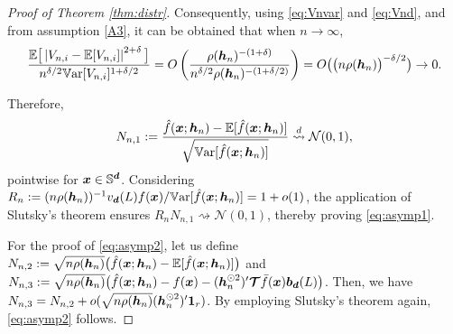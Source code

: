 \documentclass[oneside,11pt]{article}
\begin{document}
\begin{proof}[Proof of Theorem \ref{thm:distr}]
Consequently, using \eqref{eq:Vnvar} and \eqref{eq:Vnd}, and from assumption \ref{A3}, it can be obtained that when $n\to\infty$,
\begin{align*}
    \frac{\mathbb{E}\big[\left| V_{n,i}-\mathbb{E}[V_{n,i}]\right|^{2+\delta}\big]}{n^{\delta/2}\mathbb{V}\mathrm{ar}[V_{n,i}]^{1+\delta/2}}=O\left(\frac{\rho({\boldsymbol{h}}_n)^{-(1+\delta)}}{n^{\delta/2}\rho({\boldsymbol{h}}_n)^{-(1+\delta/2)}}\right)= O\big(\big(n\rho({\boldsymbol{h}}_n)\big)^{-\delta/2}\big)\to 0.
\end{align*}

Therefore,
\begin{align*}
    N_{n,1}:=\frac{\hat f(\boldsymbol{x};{\boldsymbol{h}}_n)-\mathbb{E}[\hat f(\boldsymbol{x};{\boldsymbol{h}}_n)]}{\sqrt{\mathbb{V}\mathrm{ar}[\hat f(\boldsymbol{x};{\boldsymbol{h}}_n)]}}\stackrel{d}{\rightsquigarrow} \mathcal{N}(0,1),
\end{align*}
pointwise for $\boldsymbol{x}\in\mathbb{S}^{\boldsymbol{d}}$. Considering $R_n:= (n\rho({\boldsymbol{h}}_n))^{-1}v_{\boldsymbol{d}}(L)f(\boldsymbol{x})/\mathbb{V}\mathrm{ar}[\hat f(\boldsymbol{x};{\boldsymbol{h}}_n)]=1+o(1)$, the application of Slutsky's theorem ensures $R_nN_{n,1}\rightsquigarrow \mathcal{N}(0,1)$, thereby proving \eqref{eq:asymp1}.

For the proof of \eqref{eq:asymp2}, let us define $N_{n,2}:=\sqrt{n\rho({\boldsymbol{h}}_n)}\big(\hat{f}(\boldsymbol{x};{\boldsymbol{h}}_n)-\mathbb{E}[\hat{f}(\boldsymbol{x};{\boldsymbol{h}}_n)]\big)$ and $N_{n,3}:=\sqrt{n\rho({\boldsymbol{h}}_n)}\allowbreak\big(\hat{f}(\boldsymbol{x};{\boldsymbol{h}}_n)-f(\boldsymbol{x})-({\boldsymbol{h}}_n^{\odot 2})'\boldsymbol{\mathcal{T}}\bar{f}(\boldsymbol{x})\boldsymbol{b}_{\boldsymbol{d}}(L)\big)$. Then, we have $N_{n,3}=N_{n,2}+o(\sqrt{n\rho({\boldsymbol{h}}_n)}({\boldsymbol{h}}^{\odot 2}_n)'\mathbf{1}_r)$. By employing Slutsky's theorem again, \eqref{eq:asymp2} follows.
\end{proof}
\end{document}

